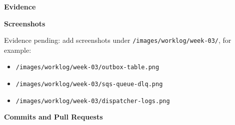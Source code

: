 \vspace{0.5em}\noindent\textbf{Evidence}\par

\vspace{0.5em}\noindent\textbf{Screenshots}\par

Evidence pending: add screenshots under
\texttt{/\allowbreak{}images/\allowbreak{}worklog/\allowbreak{}week-\allowbreak{}03/\allowbreak{}}, for example:

\begin{itemize}
\tightlist
\item
  \texttt{/\allowbreak{}images/\allowbreak{}worklog/\allowbreak{}week-\allowbreak{}03/\allowbreak{}outbox-\allowbreak{}table.\allowbreak{}png}
\item
  \texttt{/\allowbreak{}images/\allowbreak{}worklog/\allowbreak{}week-\allowbreak{}03/\allowbreak{}sqs-\allowbreak{}queue-\allowbreak{}dlq.\allowbreak{}png}
\item
  \texttt{/\allowbreak{}images/\allowbreak{}worklog/\allowbreak{}week-\allowbreak{}03/\allowbreak{}dispatcher-\allowbreak{}logs.\allowbreak{}png}
\end{itemize}

\vspace{0.5em}\noindent\textbf{Commits and Pull
Requests}\par

